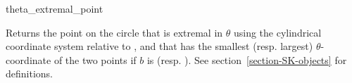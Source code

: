 \begin{ccRefFunction}{theta_extremal_point}


{Returns the point on the circle that is extremal in $\theta$ using the cylindrical coordinate system
relative to , and that has the smallest (resp. largest)
  $\theta$-coordinate of the two points if $b$ is  (resp. ).
  See section~\ref{section-SK-objects} for definitions.
}

\end{ccRefFunction}



